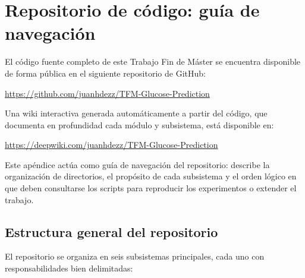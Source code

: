 \chapter{Repositorio de código: guía de navegación}
\label{chap:anexo_codigo}

El código fuente completo de este Trabajo Fin de Máster se encuentra
disponible de forma pública en el siguiente repositorio de GitHub:

\begin{center}
    \url{https://github.com/juanhdezz/TFM-Glucose-Prediction}
\end{center}

Una wiki interactiva generada automáticamente a partir del código, que
documenta en profundidad cada módulo y subsistema, está disponible en:

\begin{center}
    \url{https://deepwiki.com/juanhdezz/TFM-Glucose-Prediction}
\end{center}

Este apéndice actúa como guía de navegación del repositorio: describe la
organización de directorios, el propósito de cada subsistema y el orden
lógico en que deben consultarse los scripts para reproducir los
experimentos o extender el trabajo.

\section{Estructura general del repositorio}
\label{sec:anexo_estructura}

El repositorio se organiza en seis subsistemas principales, cada uno con
responsabilidades bien delimitadas:

